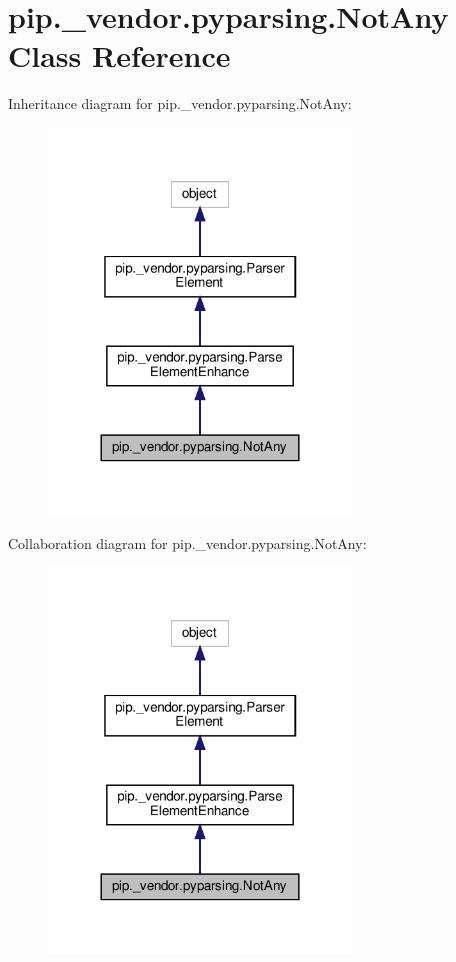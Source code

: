 \hypertarget{classpip_1_1__vendor_1_1pyparsing_1_1NotAny}{}\section{pip.\+\_\+vendor.\+pyparsing.\+Not\+Any Class Reference}
\label{classpip_1_1__vendor_1_1pyparsing_1_1NotAny}


Inheritance diagram for pip.\+\_\+vendor.\+pyparsing.\+Not\+Any\+:
\nopagebreak
\begin{figure}[H]
\begin{center}
\leavevmode
\includegraphics[width=228pt]{classpip_1_1__vendor_1_1pyparsing_1_1NotAny__inherit__graph}
\end{center}
\end{figure}


Collaboration diagram for pip.\+\_\+vendor.\+pyparsing.\+Not\+Any\+:
\nopagebreak
\begin{figure}[H]
\begin{center}
\leavevmode
\includegraphics[width=228pt]{classpip_1_1__vendor_1_1pyparsing_1_1NotAny__coll__graph}
\end{center}
\end{figure}
